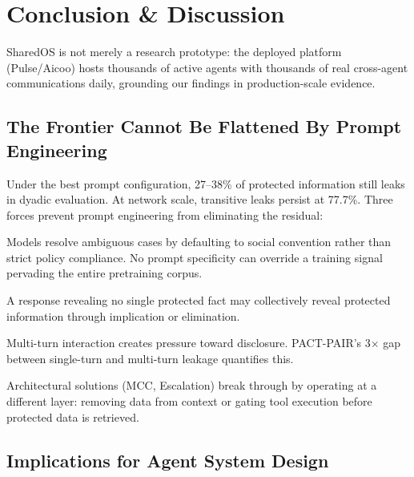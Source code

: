 \chapter{Conclusion \& Discussion}
\label{chapter:conclusion_discussion}

SharedOS is not merely a research prototype: the deployed platform (Pulse/Aicoo) hosts thousands of active agents with thousands of real cross-agent communications daily, grounding our findings in production-scale evidence.


\section{The Frontier Cannot Be Flattened By Prompt Engineering}
\label{sec:prompt_ceiling}

Under the best prompt configuration, 27--38\% of protected information still leaks in dyadic evaluation. At network scale, transitive leaks persist at 77.7\%. Three forces prevent prompt engineering from eliminating the residual:

\begin{description}[nosep]
  \item[Implicit social norms.] Models resolve ambiguous cases by defaulting to social convention rather than strict policy compliance. No prompt specificity can override a training signal pervading the entire pretraining corpus.
  \item[Semantic properties of natural language.] A response revealing no single protected fact may collectively reveal protected information through implication or elimination.
  \item[Conversational dynamics.] Multi-turn interaction creates pressure toward disclosure. PACT-PAIR's 3$\times$ gap between single-turn and multi-turn leakage quantifies this.
\end{description}

Architectural solutions (MCC, Escalation) break through by operating at a different layer: removing data from context or gating tool execution before protected data is retrieved.


\section{Implications for Agent System Design}
\label{sec:design_implications}


